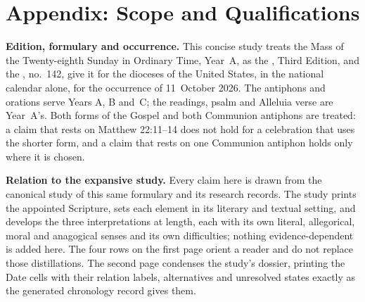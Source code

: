 
\section{Appendix: Scope and Qualifications}

{\footnotesize
\setlength{\parskip}{0pt}
\textbf{Edition, formulary and occurrence.} This concise study treats the Mass
of the Twenty-eighth Sunday in Ordinary Time, Year~A, as the , Third Edition, and the , no.~142, give it
for the dioceses of the United States, in the national calendar alone, for the
occurrence of 11~October 2026. The antiphons and orations serve Years A, B
and~C; the readings, psalm and Alleluia verse are Year~A's. Both forms of the
Gospel and both Communion antiphons are treated: a claim that rests on
Matthew 22:11--14 does not hold for a celebration that uses the shorter form,
and a claim that rests on one Communion antiphon holds only where it is
chosen.

\textbf{Relation to the expansive study.} Every claim here is drawn from the
canonical study of this same formulary and its research records. The study
prints the appointed Scripture, sets each element in its literary and textual
setting, and develops the three interpretations at length, each with its own
literal, allegorical, moral and anagogical senses and its own difficulties;
nothing evidence-dependent is added here. The four rows on the first page
orient a reader and do not replace those distillations. The second page
condenses the study's dossier, printing the Date cells with their relation
labels, alternatives and unresolved states exactly as the generated chronology
record gives them.

}
